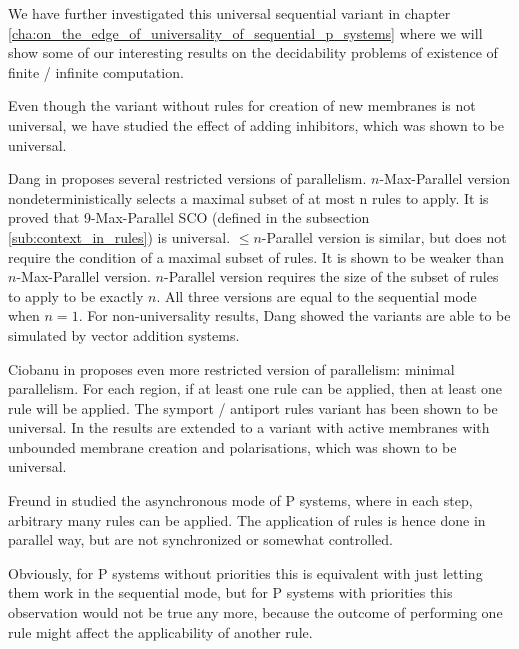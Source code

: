 We have further investigated this universal sequential variant in chapter \ref{cha:on_the_edge_of_universality_of_sequential_p_systems} where we will show some of our interesting results on the decidability problems of existence of finite / infinite computation.

Even though the variant without rules for creation of new membranes is not universal, we have studied the effect of adding inhibitors, which was shown to be universal.


Dang in \cite{Ibarra04dang} proposes several restricted versions of parallelism.
$n$-Max-Parallel version nondeterministically selects a maximal subset of at most n rules to apply. It is proved that 9-Max-Parallel SCO (defined in the subsection \ref{sub:context_in_rules}) is universal.
$\leq n$-Parallel version is similar, but does not require the condition of a maximal subset of rules. It is shown to be weaker than $n$-Max-Parallel version.
$n$-Parallel version requires the size of the subset of rules to apply to be exactly $n$.
All three versions are equal to the sequential mode when $n=1$. For non-universality results, Dang showed the variants are able to be simulated by vector addition systems.


Ciobanu in \cite{Ciobanu05MinimalParallelism} proposes even more restricted version of parallelism: minimal parallelism. For each region, if at least one rule can be applied, then at least one rule will be applied. The symport / antiport rules variant has been shown to be universal. In \cite{Ciobanu:2007:MinimalParallelism} the results are extended to a variant with active membranes with unbounded membrane creation and polarisations, which was shown to be universal.


Freund in \cite{Freund:2004:Async} studied the asynchronous mode of P systems, where in each step, arbitrary many rules can be applied. The application of rules is hence done in parallel way, but are not synchronized or somewhat controlled.

Obviously, for P systems without priorities this is equivalent with just letting them work in the sequential mode, but for P systems with priorities this observation would not be true any more, because the outcome of performing one rule might affect the applicability of another rule.


